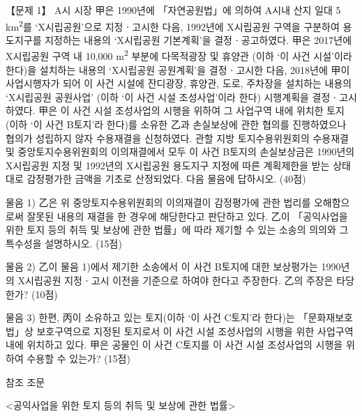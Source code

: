 \begin{longquestion}{【문제 1】}
A시 시장 甲은 1990년에 「자연공원법」에 의하여 A시내 산지 일대 5 km\textsuperscript{2}를 ‘X시립공원’으로 지정ㆍ고시한 다음, 1992년에 X시립공원 구역을 구분하여 용도지구를 지정하는 내용의 ‘X시립공원 기본계획’을 결정ㆍ공고하였다. 甲은 2017년에 X시립공원 구역 내 10,000 m\textsuperscript{2} 부분에 다목적광장 및 휴양관 (이하 ‘이 사건 시설’이라 한다)을 설치하는 내용의 ‘X시립공원 공원계획’을 결정ㆍ고시한 다음, 2018년에 甲이 사업시행자가 되어 이 사건 시설에 잔디광장, 휴양관, 도로, 주차장을 설치하는 내용의 ‘X시립공원 공원사업’ (이하 ‘이 사건 시설 조성사업’이라 한다) 시행계획을 결정ㆍ고시하였다. 甲은 이 사건 시설 조성사업의 시행을 위하여 그 사업구역 내에 위치한 토지(이하 ‘이 사건 B토지’라 한다)를 소유한 乙과 손실보상에 관한 협의를 진행하였으나 협의가 성립하지 않자 수용재결을 신청하였다. 관할 지방 토지수용위원회의 수용재결 및 중앙토지수용위원회의 이의재결에서 모두 이 사건 B토지의 손실보상금은 1990년의 X시립공원 지정 및 1992년의 X시립공원 용도지구 지정에 따른 계획제한을 받는 상태대로 감정평가한 금액을 기초로 산정되었다. 다음 물음에 답하시오. (40점) \par
\medskip\noindent 물음 1) 乙은 위 중앙토지수용위원회의 이의재결이 감정평가에 관한 법리를 오해함으로써 잘못된 내용의 재결을 한 경우에 해당한다고 판단하고 있다. 乙이 「공익사업을 위한 토지 등의 취득 및 보상에 관한 법률」에 따라 제기할 수 있는 소송의 의의와 그 특수성을 설명하시오. (15점) \par
\medskip\noindent 물음 2) 乙이 물음 1)에서 제기한 소송에서 이 사건 B토지에 대한 보상평가는 1990년의 X시립공원 지정ㆍ고시 이전을 기준으로 하여야 한다고 주장한다. 乙의 주장은 타당한가? (10점) \par
\medskip\noindent 물음 3) 한편, 丙이 소유하고 있는 토지(이하 ‘이 사건 C토지’라 한다)는 「문화재보호법」상 보호구역으로 지정된 토지로서 이 사건 시설 조성사업의 시행을 위한 사업구역 내에 위치하고 있다. 甲은 공물인 이 사건 C토지를 이 사건 시설 조성사업의 시행을 위하여 수용할 수 있는가? (15점) \par
\begin{framedtext}
참조 조문 \par
<공익사업을 위한 토지 등의 취득 및 보상에 관한 법률> \par

\end{framedtext}
\end{longquestion}
